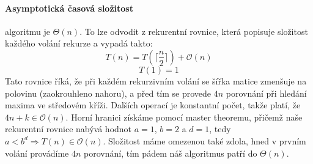 \documentclass[12pt]{iv003}
\begin{document}
\paragraph{Asymptotická časová složitost} algoritmu je $\Theta(n)$. To lze odvodit z rekurentní rovnice, která popisuje složitost každého volání rekurze a vypadá takto:\\
$$T(n) = T(\lceil \frac{n}{2} \rceil) + \mathcal{O}(n)$$
$$T(1) = 1$$
Tato rovnice říká, že při každém rekurzivním volání se šířka matice zmenšuje na polovinu (zaokrouhleno nahoru), a před tím se provede $4n$ porovnání při hledání maxima ve středovém kříži. Dalších operací je konstantní počet, takže platí, že $4n + k \in \mathcal{O}(n)$.
Horní hranici získáme pomocí master theoremu, přičemž naše rekurentní rovnice nabývá hodnot $a = 1$, $b = 2$ a $d = 1$, tedy $a < b^{d} \Rightarrow T(n) \in \mathcal{O}(n)$. Složitost máme omezenou také zdola, hned v prvním volání provádíme $4n$ porovnání, tím pádem náš algoritmus patří do $\Theta(n)$.
\end{document}
